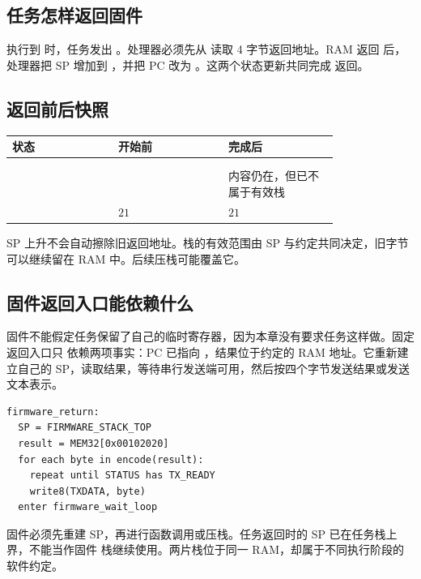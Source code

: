 \subsection{任务怎样返回固件}

执行到  时，任务发出 。处理器必须先从
 读取 4 字节返回地址。RAM 返回  后，处理器把
SP 增加到 ，并把 PC 改为 。这两个状态更新共同完成
返回。

\subsection{返回前后快照}

\begin{longtable}{|L{0.26\linewidth}|L{0.27\linewidth}|L{0.27\linewidth}|}
\hline
{}
状态 &  开始前 &  完成后 \\ \hline
{} &  &  \\ \hline
{} &  &  \\ \hline
{} &  & 内容仍在，但已不属于有效栈 \\ \hline
{} & \(21\) & \(21\) \\ \hline
\end{longtable}

SP 上升不会自动擦除旧返回地址。栈的有效范围由 SP 与约定共同决定，旧字节可以继续留在
RAM 中。后续压栈可能覆盖它。

\subsection{固件返回入口能依赖什么}

固件不能假定任务保留了自己的临时寄存器，因为本章没有要求任务这样做。固定返回入口只
依赖两项事实：PC 已指向 ，结果位于约定的 RAM 地址。它重新建立自己的
SP，读取结果，等待串行发送端可用，然后按四个字节发送结果或发送文本表示。

\begin{lstlisting}
firmware_return:
  SP = FIRMWARE_STACK_TOP
  result = MEM32[0x00102020]
  for each byte in encode(result):
    repeat until STATUS has TX_READY
    write8(TXDATA, byte)
  enter firmware_wait_loop
\end{lstlisting}

固件必须先重建 SP，再进行函数调用或压栈。任务返回时的 SP 已在任务栈上界，不能当作固件
栈继续使用。两片栈位于同一 RAM，却属于不同执行阶段的软件约定。

